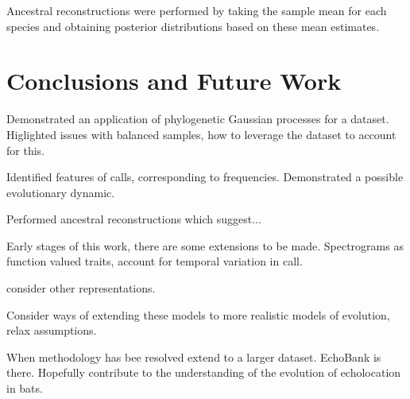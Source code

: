 \documentclass[wsdraft]{ws-rv9x6} %
\begin{document}
Ancestral reconstructions were performed by taking the sample mean for each species and obtaining posterior distributions based on these mean estimates.

\section{Conclusions and Future Work}

Demonstrated an application of phylogenetic Gaussian processes for a dataset. Higlighted issues with balanced samples, how to leverage the dataset to account for this. 

Identified features of calls, corresponding to frequencies. Demonstrated a possible evolutionary dynamic. 

Performed ancestral reconstructions which suggest...

Early stages of this work, there are some extensions to be made. Spectrograms as function valued traits, account for temporal variation in call.

consider other representations.

Consider ways of extending these models to more realistic models of evolution, relax assumptions.

When methodology has bee resolved extend to a larger dataset. EchoBank is there. Hopefully contribute to the understanding of the evolution of echolocation in bats.




\end{document}

